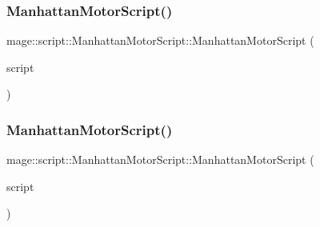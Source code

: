 \subsubsection{\texorpdfstring{Manhattan\+Motor\+Script()}{ManhattanMotorScript()}\hspace{0.1cm}{\footnotesize\ttfamily [2/3]}}
{\footnotesize\ttfamily mage\+::script\+::\+Manhattan\+Motor\+Script\+::\+Manhattan\+Motor\+Script (\begin{DoxyParamCaption}\item[{const \hyperlink{classmage_1_1script_1_1_manhattan_motor_script}{Manhattan\+Motor\+Script} \&}]{script }\end{DoxyParamCaption})\hspace{0.3cm}{\ttfamily [delete]}}

\hypertarget{classmage_1_1script_1_1_manhattan_motor_script_af8094bec366be50d60c4d6b04b77accb}{}\label{classmage_1_1script_1_1_manhattan_motor_script_af8094bec366be50d60c4d6b04b77accb} 
\subsubsection{\texorpdfstring{Manhattan\+Motor\+Script()}{ManhattanMotorScript()}\hspace{0.1cm}{\footnotesize\ttfamily [3/3]}}
{\footnotesize\ttfamily mage\+::script\+::\+Manhattan\+Motor\+Script\+::\+Manhattan\+Motor\+Script (\begin{DoxyParamCaption}\item[{\hyperlink{classmage_1_1script_1_1_manhattan_motor_script}{Manhattan\+Motor\+Script} \&\&}]{script }\end{DoxyParamCaption})\hspace{0.3cm}{\ttfamily [default]}}

\hypertarget{classmage_1_1script_1_1_manhattan_motor_script_aca76d9d5be76b048ec247e93e4a89adb}{}\label{classmage_1_1script_1_1_manhattan_motor_script_aca76d9d5be76b048ec247e93e4a89adb} 
